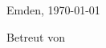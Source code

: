 \begin{titlepage}
\begin{center}
		\vspace{1cm}
		Emden, \today %

		\vspace{1.5cm}%
		Betreut von\\ %
		\betreuerEins\\ %
		\betreuerZwei\\ %
		\betreuerDrei %

	\end{center}
	\normalsize
\end{titlepage}